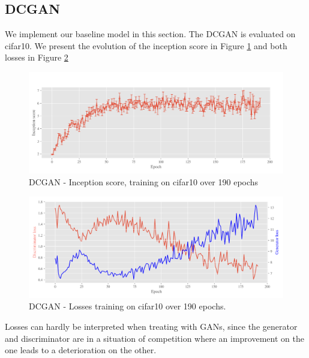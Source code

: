 \subsection{DCGAN}
\label{sec:exp-dcgan}

We implement our baseline model in this section. The DCGAN is evaluated on cifar10. We present the evolution of the inception score in Figure \ref{fig:exp-dcgan-is} and both losses in Figure \ref{fig:exp-dcgan-losses}
   
\begin{figure}[h]
\centering
\includegraphics[width=\textwidth]{../code/results/figures/dcgan_cifar10_is.png}
\caption{DCGAN - Inception score, training on cifar10 over 190 epochs}
\label{fig:exp-dcgan-is}
\end{figure}


\begin{figure}[h]
\centering
\includegraphics[width=\textwidth]{../code/results/figures/dcgan_cifar10_losses.png}
\caption{DCGAN - Losses training on cifar10 over 190 epochs.}
\label{fig:exp-dcgan-losses}
\end{figure}

Losses can hardly be interpreted when treating with GANs, since the generator and discriminator are in a situation of competition where an improvement on the one leads to a deterioration on the other.

